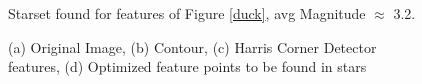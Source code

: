 \documentclass[paper=a4, fontsize=11pt]{scrartcl} %
\begin{document}
\begin{figure}[!h]
\caption{Starset found for features of Figure \ref{duck}, avg Magnitude $\approx$ 3.2. }
\label{duckstar}
\end{figure}

\begin{figure}[!h]
\caption{(a) Original Image, (b) Contour, (c) Harris Corner Detector features, (d) Optimized feature points to be found in stars}
\label{tri}
\end{figure}
\end{document}
